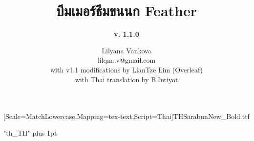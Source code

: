 \documentclass{beamer}
\begin{document}

\usepackage[no-math]{fontspec}
\usepackage{xunicode}
\usepackage{xltxtra}
\usepackage{polyglossia}

\usepackage{carlito}
\usepackage{caladea}
\usepackage{zi4}

\setdefaultlanguage{english}

\newfontfamily{\thaifont}[Scale=MatchLowercase,Mapping=tex-text,Script=Thai]{THSarabunNew_Bold.ttf}
\usepackage[Latin,Thai]{ucharclasses}
\XeTeXlinebreaklocale "th_TH"
\XeTeXlinebreakskip=0pt plus 1pt





\newcommand{\chref}[2]{
  \href{#1}{{\usebeamercolor[bg]{Feather}#2}}
}


\title[] %
{ %
      \textbf{บีมเมอร์ธีมขนนก Feather}
}

\subtitle[บีมเมอร์ธีมขนนก Feather]
{
      \textbf{v. 1.1.0}
}

\author[Lilyana Vankova, LianTze Lim, B. Intiyot]
{      Lilyana Vankova \\
      {\ttfamily lilqna.v@gmail.com}\\[1em]
      with v1.1 modifications by LianTze Lim (Overleaf)\\
      with Thai translation by B.Intiyot
}

\end{document}
